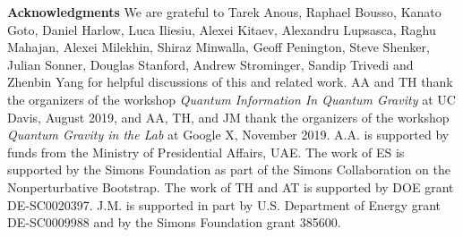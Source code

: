   



\vspace{1cm}
\textbf{Acknowledgments} We are grateful to  
Tarek Anous, Raphael Bousso, Kanato Goto, Daniel Harlow, Luca Iliesiu, Alexei Kitaev, Alexandru Lupsasca, Raghu Mahajan, Alexei Milekhin, Shiraz Minwalla,  Geoff Penington, Steve Shenker, Julian Sonner, Douglas Stanford, Andrew Strominger, Sandip Trivedi and Zhenbin Yang 
for helpful discussions of this and related work. 
AA and TH thank the organizers of the workshop \textit{Quantum Information In Quantum Gravity} at UC Davis, August 2019, and AA, TH, and JM thank the organizers of the workshop \textit{Quantum Gravity in the Lab} at Google X, November 2019. A.A. is supported by funds from the Ministry of Presidential Affairs, UAE.
The work of ES is supported by the Simons Foundation as part of the Simons Collaboration on the Nonperturbative Bootstrap. The work of TH and AT is supported by DOE grant DE-SC0020397.
J.M. is supported in part by U.S. Department of Energy grant DE-SC0009988 and by the Simons Foundation grant 385600.

